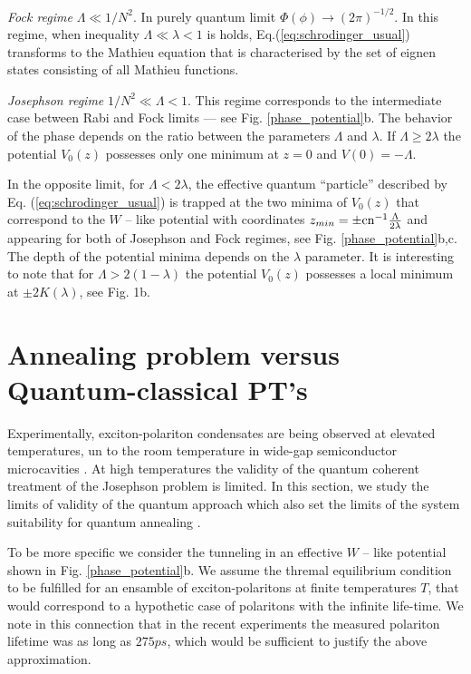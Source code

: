 \documentclass[aps, pre, preprint, groupedaddress, superscriptaddress, showkeys, showpacs] {revtex4-1}
\begin{document}
\textit{Fock regime} $\Lambda \ll 1/N^2$.
In purely quantum limit $\Phi(\phi) \to (2\pi)^{-1/2}$.
In this regime, when inequality $\Lambda \ll \lambda < 1$ is holds, Eq.(\ref{eq:schrodinger_usual}) transforms to the Mathieu equation that is characterised by the set of eignen states consisting of all Mathieu functions.

\textit{Josephson regime} $1/N^2\ll\Lambda <1$.
This regime corresponds to the intermediate case between Rabi and Fock limits --- see Fig. \ref{phase_potential}b.
The behavior of the phase depends on the ratio between the parameters $\Lambda$ and $\lambda$.
If $\Lambda \ge 2\lambda$ the potential $V_0(z)$ possesses only one minimum at $z = 0$ and $V(0) = -\Lambda$. 

In the opposite limit, for $\Lambda < 2 \lambda$, the effective quantum ``particle'' described by Eq. (\ref{eq:schrodinger_usual}) is trapped at the two minima of $V_0(z)$ that correspond to the $W$ -- like potential with coordinates $z_{min} = \pm \textrm{cn}^{-1}{\frac{\Lambda}{2 \lambda}}$ and appearing for both of Josephson and Fock regimes, see Fig. \ref{phase_potential}b,c.  
The depth of the potential minima depends on the $\lambda$ parameter.
It is interesting to note that for $\Lambda > 2(1 - \lambda)$ the potential $V_0(z)$ possesses a local minimum at $\pm 2 K(\lambda)$, see Fig. 1b.

\section{Annealing problem versus Quantum-classical PT's \label{sec:quantum_classical}}

Experimentally, exciton-polariton condensates are being observed at elevated temperatures, un to the room temperature in wide-gap semiconductor microcavities \cite{Sanvitto,Guillet}.
At high temperatures the validity of the quantum coherent treatment of the Josephson problem is limited.
In this section, we study the limits of validity of the quantum approach which also set the limits of the system suitability for quantum annealing \cite{Das}.

To be more specific we consider the tunneling in an effective $W$ -- like potential shown in Fig. \ref{phase_potential}b. We assume the thremal equilibrium condition to be fulfilled for an ensamble of exciton-polaritons at finite temperatures $T$, that would correspond to a hypothetic case of polaritons with the infinite life-time.  We note in this connection that in the recent experiments \cite{Snoke_2017} the measured polariton lifetime was as long as $275ps$, which would be sufficient to justify the above approximation.
\end{document}
